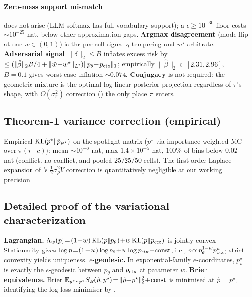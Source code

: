\paragraph{Zero-mass support mismatch} does not arise (LLM softmax
has full vocabulary support); a $\epsilon\!\ge\!10^{-30}$ floor
costs $\sim\!10^{-25}$ nat, below other approximation gaps.
\textbf{Argmax disagreement} (mode flip at one $w\!\in\!(0,1)$) is
the per-cell signal $\eta$-tempering and $w^\star$ arbitrate.
\textbf{Adversarial signal} $\|\delta\|_2\!\le\!B$ inflates excess
risk by $\le(\|\hat\beta\|_2 B/4 + \|\hat w\!-\!w^\star\|_{L^2})\|p_\theta\!-\!p_{\mathrm{ctx}}\|_1$;
empirically $\|\hat\beta\|_2\!\in\![2.31,2.96]$, $B\!=\!0.1$
gives worst-case inflation $\sim\!0.074$.  \textbf{Conjugacy} is
not required: the geometric mixture is the optimal log-linear
posterior projection regardless of $\pi$'s shape, with
$O(\sigma_r^2)$ correction ()
the only place $\pi$ enters.

\subsection{Theorem-1 variance correction (empirical)}
\label{app:t1-variance-correction}

Empirical $\operatorname{KL}(p^\star\|\hat p_{w^\star})$ on the spotlight matrix
($p^\star$ via importance-weighted MC over $\pi(r\!\mid\!c)$):
mean $\sim\!10^{-6}$ nat, max $1.4\!\times\!10^{-5}$ nat,
$100\%$ of bins below $0.02$ nat (conflict, no-conflict, and pooled
$25/25/50$ cells).  The first-order Laplace expansion of
's $\tfrac12\sigma_\rho^2 V$ correction
is quantitatively negligible at our working precision.

\subsection{Detailed proof of the variational characterization}
\label{app:variational-detail}

\textbf{Lagrangian.}  $\Lambda_w(p)\!=\!(1\!-\!w)\operatorname{KL}(p\|p_\theta)\!+\!w\operatorname{KL}(p\|p_{\mathrm{ctx}})$
is jointly convex~\citep[Thm.~2.7.2]{cover2006elements}.
Stationarity gives
$\log p\!=\!(1\!-\!w)\log p_\theta\!+\!w\log p_\ctx\!-\!\text{const}$,
i.e., $p\!\propto\!p_\theta^{1-w}p_{\mathrm{ctx}}^w$; strict convexity
yields uniqueness.
\textbf{$e$-geodesic.}  In exponential-family $e$-coordinates,
$p_w^\star$ is exactly the $e$-geodesic between $p_\theta$ and $p_{\mathrm{ctx}}$
at parameter $w$.
\textbf{Brier equivalence.}  Brier
$\mathbb{E}_{y^\star\sim p^\star}S_B(\hat p,y^\star)\!=\!\|\hat p\!-\!p^\star\|_2^2\!+\!\text{const}$
is minimised at $\hat p\!=\!p^\star$, identifying the log-loss
minimiser by .


